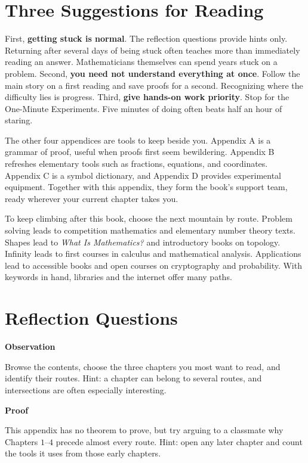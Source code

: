 \section{Three Suggestions for Reading}

First, \textbf{getting stuck is normal}. The reflection questions provide hints only. Returning after several days of being stuck often teaches more than immediately reading an answer. Mathematicians themselves can spend years stuck on a problem. Second, \textbf{you need not understand everything at once}. Follow the main story on a first reading and save proofs for a second. Recognizing where the difficulty lies is progress. Third, \textbf{give hands-on work priority}. Stop for the One-Minute Experiments. Five minutes of doing often beats half an hour of staring.

The other four appendices are tools to keep beside you. Appendix A is a grammar of proof, useful when proofs first seem bewildering. Appendix B refreshes elementary tools such as fractions, equations, and coordinates. Appendix C is a symbol dictionary, and Appendix D provides experimental equipment. Together with this appendix, they form the book's support team, ready wherever your current chapter takes you.

\begin{pandeng}
To keep climbing after this book, choose the next mountain by route. Problem solving leads to competition mathematics and elementary number theory texts. Shapes lead to \emph{What Is Mathematics?} and introductory books on topology. Infinity leads to first courses in calculus and mathematical analysis. Applications lead to accessible books and open courses on cryptography and probability. With keywords in hand, libraries and the internet offer many paths.
\end{pandeng}

\section*{Reflection Questions}

\textbf{Observation}
\begin{sikao}
\item Browse the contents, choose the three chapters you most want to read, and identify their routes. Hint: a chapter can belong to several routes, and intersections are often especially interesting.
\end{sikao}

\textbf{Proof}
\begin{sikao}
\item This appendix has no theorem to prove, but try arguing to a classmate why Chapters $1$--$4$ precede almost every route. Hint: open any later chapter and count the tools it uses from those early chapters.
\end{sikao}

